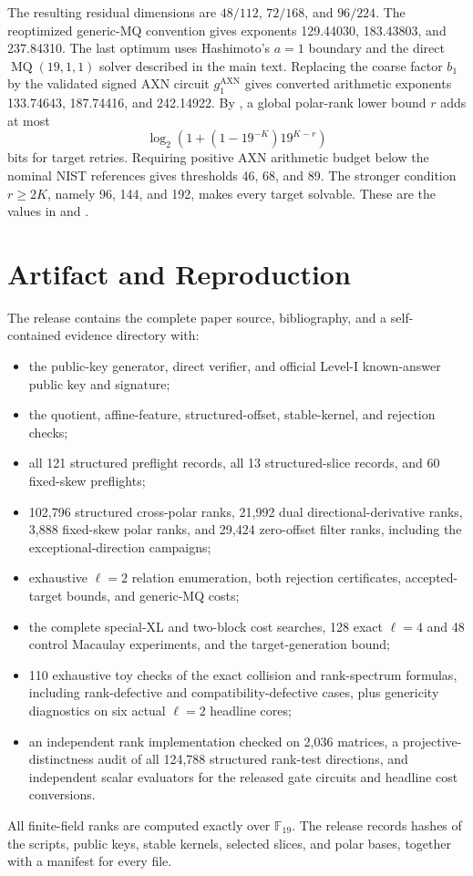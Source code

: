 \documentclass[11pt]{article}
\newcommand{\F}{\mathbb F}
\begin{document}
The resulting residual dimensions are $48/112$, $72/168$, and $96/224$.
The reoptimized generic-MQ convention gives exponents 129.44030, 183.43803,
and 237.84310.  The last optimum uses Hashimoto's $a=1$ boundary and the direct
$\operatorname{MQ}(19,1,1)$ solver described in the main text.  Replacing the coarse factor $b_1$ by the validated signed AXN circuit
$g_1^{\mathrm{AXN}}$ gives converted arithmetic exponents 133.74643,
187.74416, and 242.14922.  By , a global polar-rank
lower bound $r$ adds at most
\[
 \log_2\!\left(1+(1-19^{-K})19^{K-r}\right)
\]
bits for target retries.  Requiring positive AXN arithmetic budget below the nominal NIST references gives
thresholds 46, 68, and 89.  The stronger condition $r\ge2K$, namely 96, 144,
and 192, makes every target solvable.  These are the values in  and
.

\section{Artifact and Reproduction}\label{app:artifact}

The release contains the complete paper source, bibliography, and a
self-contained evidence directory with:
\begin{itemize}
\item the public-key generator, direct verifier, and official Level-I
known-answer public key and signature;
\item the quotient, affine-feature, structured-offset, stable-kernel, and
rejection checks;
\item all 121 structured preflight records, all 13 structured-slice records,
and 60 fixed-skew preflights;
\item 102,796 structured cross-polar ranks, 21,992 dual directional-derivative
ranks, 3,888 fixed-skew polar ranks, and 29,424 zero-offset filter ranks,
including the exceptional-direction campaigns;
\item exhaustive $\ell=2$ relation enumeration, both rejection certificates,
accepted-target bounds, and generic-MQ costs;
\item the complete special-XL and two-block cost searches, 128 exact
$\ell=4$ and 48 control Macaulay experiments, and the target-generation bound;
\item 110 exhaustive toy checks of the exact collision and rank-spectrum formulas,
including rank-defective and compatibility-defective cases, plus genericity
diagnostics on six actual $\ell=2$ headline cores;
\item an independent rank implementation checked on 2,036 matrices, a
projective-distinctness audit of all 124,788 structured rank-test directions,
and independent scalar evaluators for the released gate circuits and headline
cost conversions.
\end{itemize}
All finite-field ranks are computed exactly over $\F_{19}$.  The release
records hashes of the scripts, public keys, stable kernels, selected slices,
and polar bases, together with a manifest for every file.

\begingroup
\footnotesize
\printbibliography
\endgroup
\end{document}
